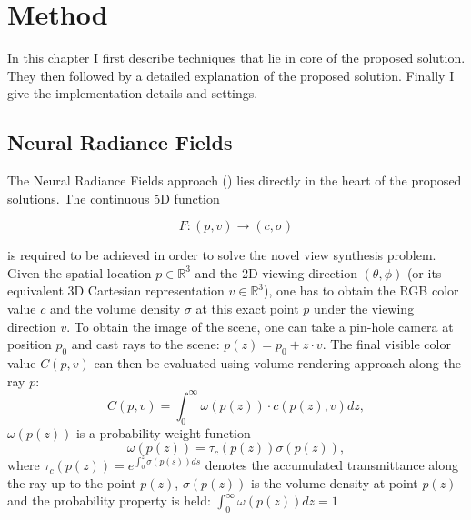 \chapter{Method}
\label{chap:method}

In this chapter I first describe techniques that lie in core of the proposed solution.
They then followed by a detailed explanation of the proposed solution.
Finally I give the implementation details and settings.

\section{Neural Radiance Fields}

The Neural Radiance Fields approach (\cite{mildenhall2020nerf}) lies directly in the heart of the proposed solutions.
The continuous 5D function 

\begin{equation}
    \label{eq:nerf_function}
    F : (p,v) \xrightarrow{} (c, \sigma)
\end{equation}

is required to be achieved in order to solve the novel view synthesis problem.
Given the spatial location $p \in \mathbb{R}^3$ and the 2D viewing direction $(\theta, \phi)$ (or its equivalent 3D Cartesian representation $v \in \mathbb{R}^3$),
one has to obtain the RGB color value $c$ and the volume density $\sigma$ at this exact point $p$ under the viewing direction $v$.
To obtain the image of the scene, one can take a pin-hole camera at position $p_0$ and cast rays to the scene: $p(z) = p_0 + z\cdot v$.
The final visible color value $C(p,v)$ can then be evaluated using volume rendering approach \cite{niemeyer2020differentiable, Novak18volumeSTAR} along the ray $p$:
\begin{equation}
    C(p,v) = \int_{0}^{\infty} \omega(p(z)) \cdot c(p(z),v) dz,
    \label{eq:rendering_equation}
\end{equation}
$\omega(p(z))$ is a probability weight function
\begin{equation}
    \omega(p(z)) = \tau_c(p(z)) \sigma(p(z)),
\end{equation}
where $\tau_c(p(z)) = e^{\int_0^z \sigma(p(s)) ds}$ denotes the accumulated transmittance along the ray up to the point $p(z)$, $\sigma(p(z))$ is the volume density at point $p(z)$ and the probability property is held: $\int_0^\infty \omega(p(z))dz = 1$

